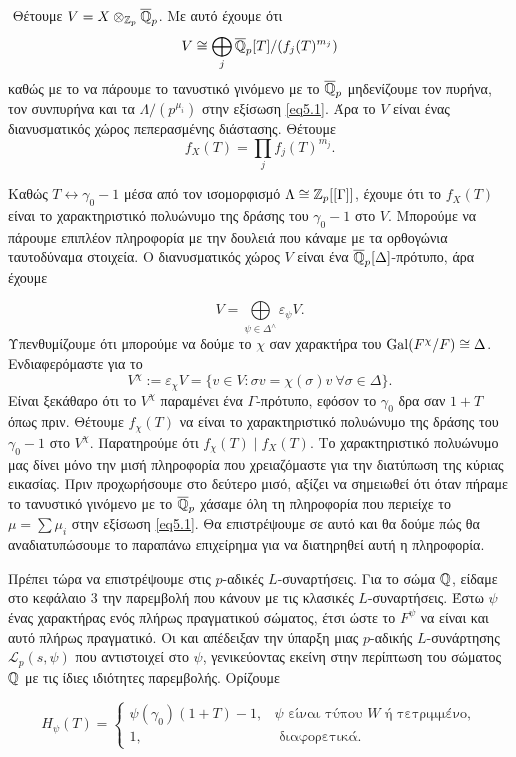 $ $\newline
Θέτουμε $V = X \otimes_{\mathbb{Z}_p} \overline{\mathbb{Q}}_p$. Με αυτό έχουμε ότι
$$V \cong \bigoplus\limits_{j}\overline{\mathbb{Q}}_p [T]/(f_j(T)^{m_j})$$ καθώς με το να πάρουμε το τανυστικό γινόμενο με το $\overline{\mathbb{Q}}_p$ μηδενίζουμε τον πυρήνα, τον συνπυρήνα και τα $\Lambda/(p^{\mu_i})$ στην εξίσωση \ref{eq5.1}. Άρα το $V$ είναι ένας διανυσματικός χώρος πεπερασμένης διάστασης. Θέτουμε
$$f_X(T) = \prod\limits_{j}f_j(T)^{m_j} .$$ 

\noindent Καθώς $T \longleftrightarrow \gamma_0 -1$ μέσα από τον ισομορφισμό $\Lambda \cong \mathbb{Z}_p[[\Gamma]]$, έχουμε ότι το $f_X(T)$ είναι το χαρακτηριστικό πολυώνυμο της δράσης του $\gamma_0-1$ στο $V$. Μπορούμε να πάρουμε επιπλέον πληροφορία με την δουλειά που κάναμε με τα ορθογώνια ταυτοδύναμα στοιχεία. Ο διανυσματικός χώρος $V$ είναι ένα $\overline{\mathbb{Q}}_p[\Delta]$-πρότυπο, άρα έχουμε 

$$V = \bigoplus\limits_{\psi \in \Delta^\wedge} \varepsilon_\psi V.$$ Υπενθυμίζουμε ότι μπορούμε να δούμε το $\chi$ σαν χαρακτήρα του $\operatorname{Gal}(F^\chi/F)\cong \Delta$. Ενδιαφερόμαστε για το
$$V^\chi := \varepsilon_\chi V = \{v\in V: \sigma v = \chi(\sigma)v \ \forall \sigma \in \Delta\}.$$ Είναι ξεκάθαρο ότι το $V^\chi$ παραμένει ένα $\Gamma$-πρότυπο, εφόσον το $\gamma_0$ δρα σαν $1+T$ όπως πριν. Θέτουμε $f_\chi(T)$ να είναι το χαρακτηριστικό πολυώνυμο της δράσης του $\gamma_0-1$ στο $V^\chi$. Παρατηρούμε ότι $f_\chi(T) \mid f_X(T)$. Το χαρακτηριστικό πολυώνυμο μας δίνει μόνο την μισή πληροφορία που χρειαζόμαστε για την διατύπωση της κύριας εικασίας. Πριν προχωρήσουμε στο δεύτερο μισό, αξίζει να σημειωθεί ότι όταν πήραμε το τανυστικό γινόμενο με το $\overline{\mathbb{Q}}_p$ χάσαμε όλη τη πληροφορία που περιείχε το $\mu = \sum \mu_i$ στην εξίσωση \ref{eq5.1}. Θα επιστρέψουμε σε αυτό και θα δούμε πώς θα αναδιατυπώσουμε το παραπάνω επιχείρημα για να διατηρηθεί αυτή η πληροφορία.

Πρέπει τώρα να επιστρέψουμε στις $p$-αδικές $L$-συναρτήσεις. Για το σώμα $\mathbb{Q}$, είδαμε στο κεφάλαιο 3 την παρεμβολή που 
κάνουν με τις κλασικές $L$-συναρτήσεις. Έστω $\psi$ ένας χαρακτήρας ενός πλήρως πραγματικού σώματος, έτσι ώστε το $F^\psi$ να είναι 
και αυτό πλήρως πραγματικό. Οι  και  \cite{DR} απέδειξαν την ύπαρξη μιας $p$-αδικής $L$-συνάρτησης 
$\mathcal{L}_p(s,\psi)$ που αντιστοιχεί στο $\psi$, γενικεύοντας εκείνη στην περίπτωση του σώματος $\mathbb{Q}$ με τις ίδιες ιδιότητες παρεμβολής. Ορίζουμε


$$H_\psi(T) = \begin{cases}
    \psi(\gamma_0)(1+T)-1, & \psi \text{ είναι τύπου } W \text{ ή τετριμμένο}, \\
    1, & \text{ διαφορετικά. }
\end{cases}$$

